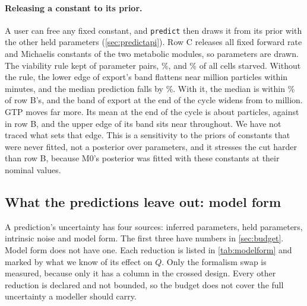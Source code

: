 \paragraph{Releasing a constant to its prior.} A user can free any fixed constant, and
\texttt{predict} then draws it from its prior with the other held parameters
(\cref{sec:predictapi}). Row C releases all  fixed forward rate and
Michaelis constants of the two metabolic modules, so  parameters are drawn. The viability
rule kept  of  parameter pairs, \%, and
\% of all cells starved. Without the rule, the lower edge of export's band
flattens near  million particles within minutes, and the median prediction falls by
\%. With it, the median is within \% of row B's, and the band of
export at the end of the cycle widens from  to  million. GTP moves
far more. Its mean at the end of the cycle is about  particles, against
 in row B, and the upper edge of its band sits near  throughout. We
have not traced what sets that edge. This is a sensitivity to the priors of constants that were
never fitted, not a posterior over  parameters, and it stresses the cut harder
than row B, because M0's posterior was fitted with these constants at their nominal values.

\subsection{What the predictions leave out: model form}
\label{sec:modelform}

A prediction's uncertainty has four sources: inferred parameters, held parameters,
intrinsic noise and model form. The first three have numbers in \cref{sec:budget}. Model
form does not have one. Each reduction is listed in \cref{tab:modelform} and marked by
what we know of its effect on $Q$. Only the formalism swap is measured, because only it
has a column in the crossed design. Every other reduction is declared and not bounded, so
the budget does not cover the full uncertainty a modeller should carry.


